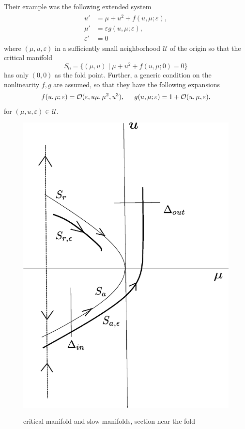 \documentclass[letterpaper,11pt]{article}
\newcommand{\rmO}{\mathcal{O}}
\newcommand{\eps}{\varepsilon}
\numberwithin{equation}{section}
\theoremstyle{plain}
\begin{document}
Their example was the following extended system 
\begin{align}\label{ori_eqn}
\begin{split}
u' &= \mu+u^2+ f(u,\mu; \eps),\\
\mu' &=  \eps g(u,\mu; \eps), \\
\eps' &= 0
\end{split}
\end{align}
where $(\mu, u, \eps)$ in a sufficiently small neighborhood $\mathcal{U}$ of the origin so that the critical manifold 
\[
S_0 = \{ (\mu, u) \mid \mu + u^2 +f (u,\mu ;0) = 0\}
\]
 has only $(0,0)$ as the fold point.
 Further, a generic condition on the nonlinearity $f, g$ are assumed, so that they have the following expansions
\begin{equation} \label{fold_nonlinearity}
f(u,\mu;\eps) = \rmO(\eps, u\mu,\mu^2,u^3),\hspace{0.2in}
g(u,\mu;\eps) = 1+\rmO(u,\mu,\eps),
\end{equation} 
for $(\mu, u,\eps) \in \mathcal{U}$.

\begin{figure}[ht]
 \centering %
 \scalebox{0.3} %
 {\includegraphics{pictures/passage_fold.eps}} %
 \caption{critical manifold and slow manifolds, section near the fold}\label{fig:passage}
\end{figure}
\end{document}
